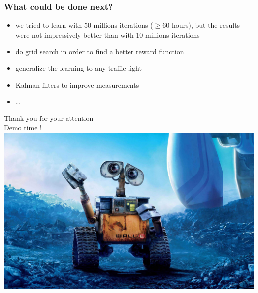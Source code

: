 \documentclass[dvipsnames,svgnames]{beamer}
\begin{document}
\begin{frame}
\frametitle{What could be done next?}
\begin{itemize}
\item we tried to learn with 50 millions iterations ($\geq 60$ hours), but the results were not impressively better than with 10 millions iterations 
\item do grid search in order to find a better reward function
\item generalize the learning to any traffic light
\item Kalman filters to improve measurements 
\item \ldots
\end{itemize}
\end{frame}




\begin{frame}{}
\centering
Thank you for your attention\\ Demo time !\\
\vspace{0.5cm}
\centering
\includegraphics[scale=0.1]{img/walle_end.jpg}
\end{frame}
\end{document}
